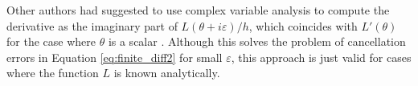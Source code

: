 Other authors had suggested to use complex variable analysis to compute the derivative as the imaginary part of $L(\theta + i \varepsilon)/h$, which coincides with $L'(\theta)$ for the case where $\theta$ is a scalar \cite{Squire_Trapp_1998_complex_diff, Martins_Sturdza_Alonso_2003_complex_differentiation}.
Although this solves the problem of cancellation errors in Equation \eqref{eq:finite_diff2} for small $\varepsilon$, this approach is just valid for cases where the function $L$ is known analytically. 

 


